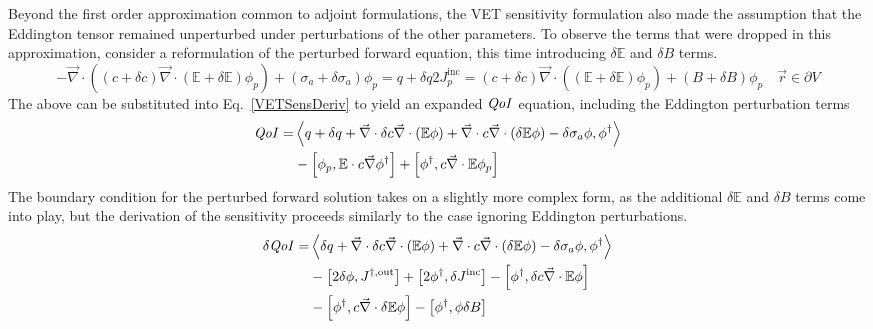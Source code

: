 \documentclass{article}
\newcommand{\vr}{\vec{r}}
\newcommand{\bra}{\left\langle}
\newcommand{\ket}{\right\rangle}
\newcommand{\sbra}{\left[}
\newcommand{\sket}{\right]}
\renewcommand{\div}{\vec{\nabla} \cdot}
\newcommand{\grad}{\vec{\nabla}}
\newcommand{\Edd}{\mathbb{E}}
\newcommand{\BEdd}{B}
\newcommand{\siga}{\sigma_a}
\newcommand{\isigt}{c}
\newcommand{\scalSource}{q}
\newcommand{\qoi}{{\it QoI}\xspace}
\begin{document}
Beyond the first order approximation common to adjoint formulations, the VET sensitivity formulation also made the assumption that the Eddington tensor remained unperturbed under perturbations of the other parameters. To observe the terms that were dropped in this approximation, consider a reformulation of the perturbed forward equation, this time introducing $\delta \Edd$ and $\delta  B$ terms. 
\begin{subequations}
\begin{equation}
\label{VEFPerEdd}
- \div \left((\isigt + \delta \isigt)\div (\Edd + \delta \Edd) \phi_p \right) + (\siga + \delta \siga)\phi_p = \scalSource + \delta \scalSource
\end{equation}
\begin{equation}
2J_p^{\text{inc}} =
(\isigt + \delta \isigt) \vec{\nabla} \cdot \left((\Edd + \delta \Edd) \phi_p \right)  + (\BEdd +\delta \BEdd) \phi_p \quad \vr \in \partial V
\end{equation}
\end{subequations}
The above can be substituted into Eq.~\eqref{VETSensDeriv} to yield an expanded $\qoi$ equation, including the Eddington perturbation terms
\begin{equation}
\label{QoIVETAdjNoBCEdd}
\begin{split}
\qoi =& \bra \scalSource + \delta \scalSource + \div \delta \isigt \div \left( \Edd \phi \right) + \div \isigt \div \left( \delta \Edd \phi \right) - \delta \siga \phi, \phi^\dag \ket \\
&- \sbra \phi_p, \Edd \cdot \isigt \grad \phi^\dag \sket 
+ \sbra \phi^\dag , \isigt \div \Edd \phi_p \sket
\end{split}
\end{equation}
The boundary condition for the perturbed forward solution takes on a slightly more complex form, as the additional $\delta \Edd$ and $\delta \BEdd$ terms come into play, but the derivation of the sensitivity proceeds similarly to the case ignoring Eddington perturbations.
\begin{equation}
\label{QoIVETAdjEdd}
\begin{split}
\delta \qoi =& \bra \delta \scalSource + \div \delta \isigt \div \left( \Edd \phi \right) + \div \isigt \div \left( \delta \Edd \phi \right) - \delta \siga \phi, \phi^\dag \ket \\
&- \sbra 2\delta \phi, J^{\dag, \text{out}} \sket  + \sbra 2\phi^\dag, \delta J^{\text{inc}} \sket
- \sbra \phi^\dag, \delta \isigt \div \Edd \phi \sket
\\
&- \sbra  \phi^\dag ,\isigt \div \delta \Edd \phi \sket
- \sbra \phi^\dag, \phi \delta \BEdd \sket
\end{split}
\end{equation} 
\end{document}
